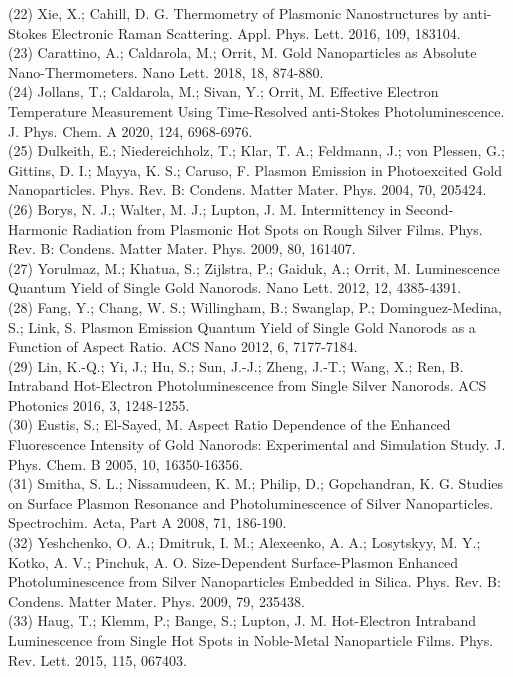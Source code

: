 \documentclass[10pt]{article}
\begin{document}
(22) Xie, X.; Cahill, D. G. Thermometry of Plasmonic Nanostructures by anti-Stokes Electronic Raman Scattering. Appl. Phys. Lett. 2016, 109, 183104.\\
(23) Carattino, A.; Caldarola, M.; Orrit, M. Gold Nanoparticles as Absolute Nano-Thermometers. Nano Lett. 2018, 18, 874-880.\\
(24) Jollans, T.; Caldarola, M.; Sivan, Y.; Orrit, M. Effective Electron Temperature Measurement Using Time-Resolved anti-Stokes Photoluminescence. J. Phys. Chem. A 2020, 124, 6968-6976.\\
(25) Dulkeith, E.; Niedereichholz, T.; Klar, T. A.; Feldmann, J.; von Plessen, G.; Gittins, D. I.; Mayya, K. S.; Caruso, F. Plasmon Emission in Photoexcited Gold Nanoparticles. Phys. Rev. B: Condens. Matter Mater. Phys. 2004, 70, 205424.\\
(26) Borys, N. J.; Walter, M. J.; Lupton, J. M. Intermittency in Second-Harmonic Radiation from Plasmonic Hot Spots on Rough Silver Films. Phys. Rev. B: Condens. Matter Mater. Phys. 2009, 80, 161407.\\
(27) Yorulmaz, M.; Khatua, S.; Zijlstra, P.; Gaiduk, A.; Orrit, M. Luminescence Quantum Yield of Single Gold Nanorods. Nano Lett. 2012, 12, 4385-4391.\\
(28) Fang, Y.; Chang, W. S.; Willingham, B.; Swanglap, P.; Dominguez-Medina, S.; Link, S. Plasmon Emission Quantum Yield of Single Gold Nanorods as a Function of Aspect Ratio. ACS Nano 2012, 6, 7177-7184.\\
(29) Lin, K.-Q.; Yi, J.; Hu, S.; Sun, J.-J.; Zheng, J.-T.; Wang, X.; Ren, B. Intraband Hot-Electron Photoluminescence from Single Silver Nanorods. ACS Photonics 2016, 3, 1248-1255.\\
(30) Eustis, S.; El-Sayed, M. Aspect Ratio Dependence of the Enhanced Fluorescence Intensity of Gold Nanorods: Experimental and Simulation Study. J. Phys. Chem. B 2005, 10, 16350-16356.\\
(31) Smitha, S. L.; Nissamudeen, K. M.; Philip, D.; Gopchandran, K. G. Studies on Surface Plasmon Resonance and Photoluminescence of Silver Nanoparticles. Spectrochim. Acta, Part A 2008, 71, 186-190.\\
(32) Yeshchenko, O. A.; Dmitruk, I. M.; Alexeenko, A. A.; Losytskyy, M. Y.; Kotko, A. V.; Pinchuk, A. O. Size-Dependent Surface-Plasmon Enhanced Photoluminescence from Silver Nanoparticles Embedded in Silica. Phys. Rev. B: Condens. Matter Mater. Phys. 2009, 79, 235438.\\
(33) Haug, T.; Klemm, P.; Bange, S.; Lupton, J. M. Hot-Electron Intraband Luminescence from Single Hot Spots in Noble-Metal Nanoparticle Films. Phys. Rev. Lett. 2015, 115, 067403.\\
\end{document}
